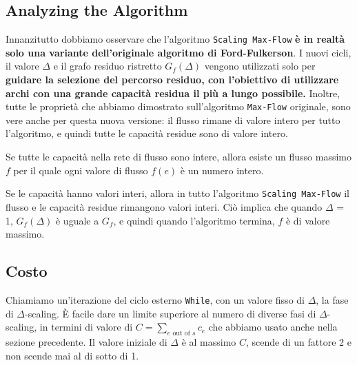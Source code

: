 \subsection{Analyzing the Algorithm}

Innanzitutto dobbiamo osservare che l'algoritmo
\texttt{Scaling\ Max-Flow} \textbf{è in realtà solo una variante
  dell'originale algoritmo di Ford-Fulkerson}. I nuovi cicli, il valore
$\Delta$ e il grafo residuo ristretto $G_f(\Delta)$ vengono
utilizzati solo per \textbf{guidare la selezione del percorso residuo,
  con l'obiettivo di utilizzare archi con una grande capacità residua il
  più a lungo possibile.} Inoltre, tutte le proprietà che abbiamo
dimostrato sull'algoritmo \texttt{Max-Flow} originale, sono vere anche
per questa nuova versione: il flusso rimane di valore intero per tutto
l'algoritmo, e quindi tutte le capacità residue sono di valore intero.

\begin{myblockquote}
  \begin{minipage}{\textwidth}
    \begin{definition}\label{def:7.14}
      Se tutte le capacità nella rete di flusso sono intere, allora
      esiste un flusso massimo $f$ per il quale ogni valore di flusso
      $f(e)$ è un numero intero.
    \end{definition}
  \end{minipage}
\end{myblockquote}
\begin{myblockquote}
  \begin{minipage}{\textwidth}
    \begin{definition}\label{def:7.15}
      Se le capacità hanno valori interi, allora in tutto l'algoritmo
      \texttt{Scaling\ Max-Flow} il flusso e le capacità residue rimangono
      valori interi. Ciò implica che quando $\Delta$ = 1, $G_f(\Delta)$ è
      uguale a $G_f$, e quindi quando l'algoritmo termina, $f$ è di valore
      massimo.
    \end{definition}
  \end{minipage}
\end{myblockquote}

\subsection{Costo}

Chiamiamo un'iterazione del ciclo esterno \texttt{While}, con un valore
fisso di $\Delta$, la fase di $\Delta$-scaling. È facile dare un
limite superiore al numero di diverse fasi di $\Delta$-scaling, in
termini di valore di $C = \sum_{e \text{ out of }s} c_e$ che abbiamo
usato anche nella sezione precedente. Il valore iniziale di $\Delta$ è
al massimo $C$, scende di un fattore 2 e non scende mai al di sotto di
1.\\

